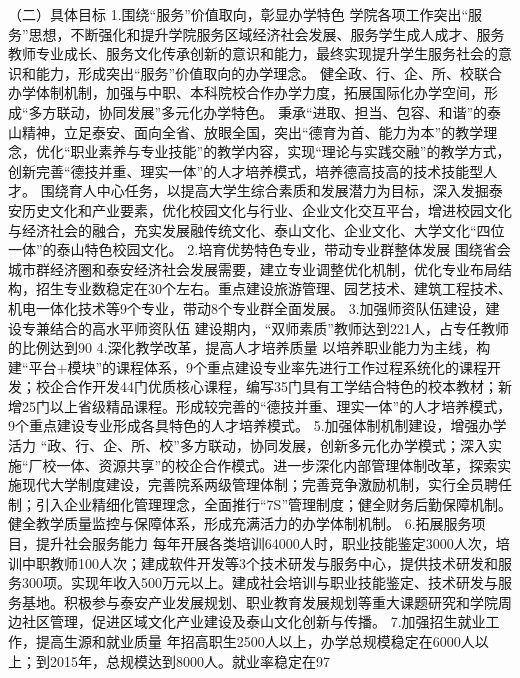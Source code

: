 （二）具体目标
1.围绕“服务”价值取向，彰显办学特色
学院各项工作突出“服务”思想，不断强化和提升学院服务区域经济社会发展、服务学生成人成才、服务教师专业成长、服务文化传承创新的意识和能力，最终实现提升学生服务社会的意识和能力，形成突出“服务”价值取向的办学理念。                      
健全政、行、企、所、校联合办学体制机制，加强与中职、本科院校合作办学力度，拓展国际化办学空间，形成“多方联动，协同发展”多元化办学特色。
秉承“进取、担当、包容、和谐”的泰山精神，立足泰安、面向全省、放眼全国，突出“德育为首、能力为本”的教学理念，优化“职业素养与专业技能”的教学内容，实现“理论与实践交融”的教学方式，创新完善“德技并重、理实一体”的人才培养模式，培养德高技高的技术技能型人才。
围绕育人中心任务，以提高大学生综合素质和发展潜力为目标，深入发掘泰安历史文化和产业要素，优化校园文化与行业、企业文化交互平台，增进校园文化与经济社会的融合，充实发展融传统文化、泰山文化、企业文化、大学文化“四位一体”的泰山特色校园文化。
2.培育优势特色专业，带动专业群整体发展
围绕省会城市群经济圈和泰安经济社会发展需要，建立专业调整优化机制，优化专业布局结构，招生专业数稳定在30个左右。重点建设旅游管理、园艺技术、建筑工程技术、机电一体化技术等9个专业，带动8个专业群全面发展。
3.加强师资队伍建设，建设专兼结合的高水平师资队伍
建设期内，“双师素质”教师达到221人，占专任教师的比例达到90%
4.深化教学改革，提高人才培养质量
以培养职业能力为主线，构建“平台+模块”的课程体系，9个重点建设专业率先进行工作过程系统化的课程开发；校企合作开发44门优质核心课程，编写35门具有工学结合特色的校本教材；新增25门以上省级精品课程。形成较完善的“德技并重、理实一体”的人才培养模式，9个重点建设专业形成各具特色的人才培养模式。
5.加强体制机制建设，增强办学活力
“政、行、企、所、校”多方联动，协同发展，创新多元化办学模式；深入实施“厂校一体、资源共享”的校企合作模式。进一步深化内部管理体制改革，探索实施现代大学制度建设，完善院系两级管理体制；完善竞争激励机制，实行全员聘任制；引入企业精细化管理理念，全面推行“7S”管理制度；健全财务后勤保障机制。健全教学质量监控与保障体系，形成充满活力的办学体制机制。
6.拓展服务项目，提升社会服务能力
每年开展各类培训64000人时，职业技能鉴定3000人次，培训中职教师100人次；建成软件开发等3个技术研发与服务中心，提供技术研发和服务300项。实现年收入500万元以上。建成社会培训与职业技能鉴定、技术研发与服务基地。积极参与泰安产业发展规划、职业教育发展规划等重大课题研究和学院周边社区管理，促进区域文化产业建设及泰山文化创新与传播。
7.加强招生就业工作，提高生源和就业质量
年招高职生2500人以上，办学总规模稳定在6000人以上；到2015年，总规模达到8000人。就业率稳定在97%
